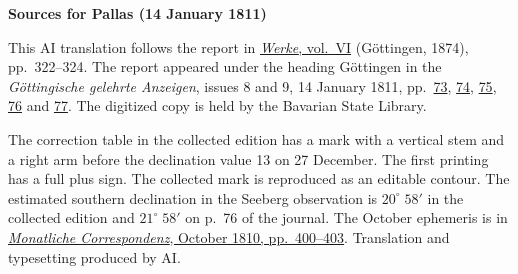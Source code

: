\clearpage\thispagestyle{empty}
\begin{center}\textbf{Sources for Pallas (14 January 1811)}\end{center}
\noindent This AI translation follows the report in \href{https://gdz.sub.uni-goettingen.de/id/PPN236007467}{\textit{Werke}, vol.~VI} (Göttingen, 1874), pp.~322--324. The report appeared under the heading Göttingen in the \textit{Göttingische gelehrte Anzeigen}, issues 8 and 9, 14 January 1811, pp.~\href{https://api.digitale-sammlungen.de/iiif/image/v2/bsb10538679_00109/full/1600,/0/default.jpg}{73}, \href{https://api.digitale-sammlungen.de/iiif/image/v2/bsb10538679_00110/full/1600,/0/default.jpg}{74}, \href{https://api.digitale-sammlungen.de/iiif/image/v2/bsb10538679_00111/full/1600,/0/default.jpg}{75}, \href{https://api.digitale-sammlungen.de/iiif/image/v2/bsb10538679_00112/full/1600,/0/default.jpg}{76} and \href{https://api.digitale-sammlungen.de/iiif/image/v2/bsb10538679_00113/full/1600,/0/default.jpg}{77}. The digitized copy is held by the Bavarian State Library.
\par\smallskip\noindent The correction table in the collected edition has a mark with a vertical stem and a right arm before the declination value 13 on 27 December. The first printing has a full plus sign. The collected mark is reproduced as an editable contour. The estimated southern declination in the Seeberg observation is $20^\circ\;58'$ in the collected edition and $21^\circ\;58'$ on p.~76 of the journal. The October ephemeris is in \href{https://archive.org/download/bub_gb_YCI4AAAAMAAJ/page/n403.jpg}{\textit{Monatliche Correspondenz}, October 1810, pp.~400--403}. Translation and typesetting produced by AI.
\clearpage

